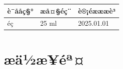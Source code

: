\documentclass[UTF8,10pt,a4paper,fontset=fandol]{ctexart}
\newcommand{\fieldvalue}[1]{#1}
\newcommand{\handwritten}[1]{#1}
\begin{document}
\begin{center}
\begin{tabular}{|p{}|p{}|p{}|}
\hline
è¯ååç§° & æå¤§éç¨ & è®¡éæææè³\\
\hline
éç­ &
\fieldvalue{\handwritten{25 ml}} &
\fieldvalue{\handwritten{2025.01.01}}\\
\hline
\end{tabular}
\end{center}

\section{æä½æ­¥éª¤}
\end{document}
